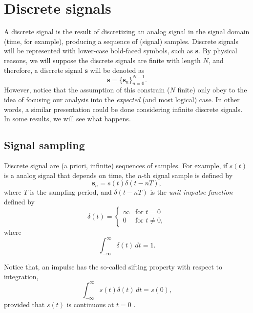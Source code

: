 \chapter{Discrete signals}

A discrete signal is the result of discretizing an analog signal in
the signal domain (time, for example), producing a sequence of
(signal) samples. Discrete signals will be represented with lower-case
bold-faced symbols, such as $\mathbf{s}$. By physical reasons, we will
suppose the discrete signals are finite with length $N$, and
therefore, a discrete signal $\mathbf{s}$ will be denoted as
\begin{equation}
  \mathbf{s} = \{\mathbf{s}_n\}_{n=0}^{N-1}.
\end{equation}
However, notice that the assumption of this constrain ($N$ finite)
only obey to the idea of focusing our analysis into the
\emph{expected} (and most logical) case. In other words, a similar
presentation could be done considering infinite discrete signals. In
some results, we will see what happens.

\section{Signal sampling}

Discrete signal are (a priori, infinite) sequences of samples. For example, if $s(t)$ is
a analog signal that depends on time, the $n$-th signal sample is defined by
\begin{equation}
  \mathbf{s}_n = s(t)\delta(t-nT),
\end{equation}
where  $T$ is the sampling period, and
$\delta(t-nT)$ is the \emph{unit impulse function} defined by
\begin{equation}
\delta(t) =
\begin{cases}
\infty & \text{for } t = 0 \\
0 & \text{for } t \neq 0,
\end{cases}
\end{equation}
where
\begin{equation}
\int_{-\infty}^{\infty} \delta(t) \, dt = 1.
\end{equation}

Notice that, an impulse has the so-called sifting property with
respect to integration,
\begin{equation}
\int_{-\infty}^{\infty} s(t)\delta(t) \, dt = s(0),
\end{equation}
provided that $s(t)$ is continuous at $t=0$ \cite{gonzalez1992digital}.


